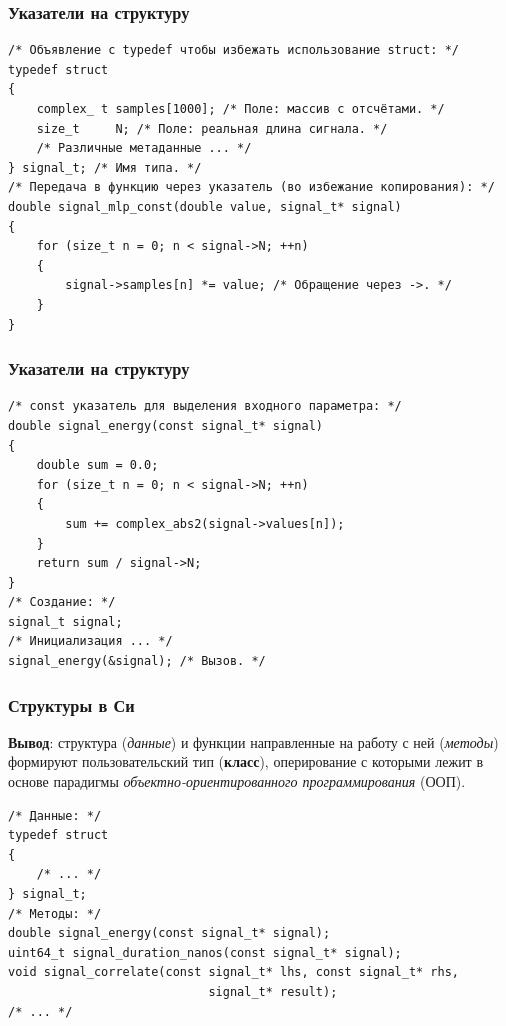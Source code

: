 \documentclass{beamer}
\begin{document}
    \begin{frame}[fragile]
        \frametitle{Указатели на структуру}
        \justifying
        \begin{verbatim}
/* Объявление с typedef чтобы избежать использование struct: */
typedef struct 
{
    complex_ t samples[1000]; /* Поле: массив с отсчётами. */
    size_t     N; /* Поле: реальная длина сигнала. */
    /* Различные метаданные ... */
} signal_t; /* Имя типа. */
/* Передача в функцию через указатель (во избежание копирования): */
double signal_mlp_const(double value, signal_t* signal)
{
    for (size_t n = 0; n < signal->N; ++n)
    {
        signal->samples[n] *= value; /* Обращение через ->. */
    }
}
        \end{verbatim}
    \end{frame}
    \begin{frame}[fragile]
        \frametitle{Указатели на структуру}
        \justifying
        \begin{verbatim}
/* const указатель для выделения входного параметра: */
double signal_energy(const signal_t* signal)
{
    double sum = 0.0;
    for (size_t n = 0; n < signal->N; ++n)
    {
        sum += complex_abs2(signal->values[n]);
    }
    return sum / signal->N;
}
/* Создание: */
signal_t signal;
/* Инициализация ... */
signal_energy(&signal); /* Вызов. */
        \end{verbatim}
    \end{frame}
    \begin{frame}[fragile]
        \frametitle{Структуры в Си}
        \justifying
        {\bf Вывод}: структура ({\it данные}) и функции направленные на работу с ней ({\it методы}) формируют пользовательский тип ({\bf класс}), оперирование с которыми лежит в основе парадигмы {\it объектно-ориентированного программирования} (ООП).
        \begin{verbatim}
/* Данные: */
typedef struct 
{
    /* ... */
} signal_t;
/* Методы: */
double signal_energy(const signal_t* signal);
uint64_t signal_duration_nanos(const signal_t* signal);
void signal_correlate(const signal_t* lhs, const signal_t* rhs, 
                            signal_t* result);
/* ... */
        \end{verbatim}
    \end{frame}
\end{document}
